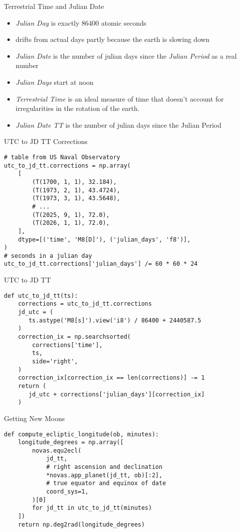 \documentclass[table]{beamer}
\begin{document}
\begin{frame}{Terrestrial Time and Julian Date}
  \begin{itemize}
  \item<+-> \textit{Julian Day} is exactly 86400 atomic
    seconds
  \item<+-> drifts from actual days partly because the earth is slowing down
  \item<+-> \textit{Julian Date} is the number of julian days since the
    \textit{Julian Period} as a real number
  \item<+-> \textit{Julian Days} start at noon
  \item<+-> \textit{Terrestrial Time} is an ideal measure of time that doesn't
    account for irregularities in the rotation of the earth.
  \item<+-> \textit{Julian Date TT} is the number of julian days since the
    Julian Period
  \end{itemize}
\end{frame}

\begin{frame}[fragile]{UTC to JD TT Corrections}
  \begin{verbatim}
# table from US Naval Observatory
utc_to_jd_tt.corrections = np.array(
    [
        (T(1700, 1, 1), 32.184),
        (T(1973, 2, 1), 43.4724),
        (T(1973, 3, 1), 43.5648),
        # ...
        (T(2025, 9, 1), 72.0),
        (T(2026, 1, 1), 72.0),
    ],
    dtype=[('time', 'M8[D]'), ('julian_days', 'f8')],
)
# seconds in a julian day
utc_to_jd_tt.corrections['julian_days'] /= 60 * 60 * 24
  \end{verbatim}
\end{frame}

\begin{frame}[fragile]{UTC to JD TT}
  \begin{verbatim}
def utc_to_jd_tt(ts):
    corrections = utc_to_jd_tt.corrections
    jd_utc = (
       ts.astype('M8[s]').view('i8') / 86400 + 2440587.5
    )
    correction_ix = np.searchsorted(
        corrections['time'],
        ts,
        side='right',
    )
    correction_ix[correction_ix == len(corrections)] -= 1
    return (
       jd_utc + corrections['julian_days'][correction_ix]
    )
  \end{verbatim}
\end{frame}

\begin{frame}[fragile]{Getting New Moons}
  \begin{verbatim}
def compute_ecliptic_longitude(ob, minutes):
    longitude_degrees = np.array([
        novas.equ2ecl(
            jd_tt,
            # right ascension and declination
            *novas.app_planet(jd_tt, ob)[:2],
            # true equator and equinox of date
            coord_sys=1,
        )[0]
        for jd_tt in utc_to_jd_tt(minutes)
    ])
    return np.deg2rad(longitude_degrees)
  \end{verbatim}
\end{frame}
\end{document}
